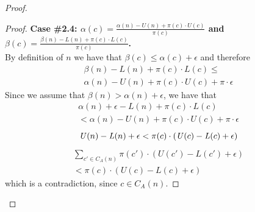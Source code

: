 \documentclass[runningheads]{llncs}
\newcommand{\MM}{\mathit{V}}
\newcommand{\pess}{\mathit{L}}
\newcommand{\opti}{\mathit{U}}
\begin{document}
\begin{proof}
\begin{proof}
{\bf Case \#2.4: $\alpha(c)=\frac{\alpha(n)-\opti(n)+\pi(c)\cdot\opti(c)}{\pi(c)}$ 
	and \\ $\beta(c)=\frac{\beta(n)-\pess(n)+\pi(c)\cdot\pess(c)}{\pi(c)}$.} \\
By definition of $n$ we have that $\beta(c)\leq \alpha(c)+\epsilon$ and therefore 
\begin{multline}
\beta(n)-\pess(n)+\pi(c)\cdot\pess(c) \leq \\
\alpha(n)-\opti(n)+\pi(c)\cdot\opti(c) + \pi\cdot\epsilon 
\end{multline}
Since we assume that $\beta(n)>\alpha(n)+\epsilon$, we have that
\begin{multline}
\alpha(n)+\epsilon-\pess(n)+\pi(c)\cdot\pess(c)  \\
< \alpha(n)-\opti(n)+\pi(c)\cdot\opti(c) + \pi\cdot\epsilon 
\end{multline}
\begin{equation} 
\opti(n)-\pess(n)+\epsilon <  \pi(c)\cdot(\opti(c)-\pess(c) + \epsilon) \\
\end{equation}
\begin{multline}
\sum_{c'\in C_A(n)} \pi(c')\cdot(\opti(c')-\pess(c') + \epsilon) \\ 
<\pi(c)\cdot(\opti(c)-\pess(c) + \epsilon)
\end{multline}
which is a contradiction, since $c\in C_A(n)$. 
\end{proof}





\end{proof}
\end{document}
